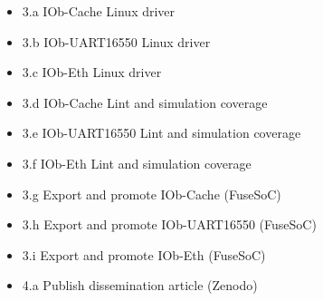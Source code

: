 \begin{description}[itemsep=3ex]
    \item[Milestone 3 - Test and Validation] \leavevmode
    \begin{itemize}[topsep=0pt, partopsep=0pt, itemsep=0.5ex, parsep=0pt]
        \item [ ] 3.a IOb-Cache Linux driver
        \item [ ] 3.b IOb-UART16550 Linux driver
        \item [ ] 3.c IOb-Eth Linux driver
        \item [$\checkmark$] 3.d IOb-Cache Lint and simulation coverage
        \item [$\checkmark$] 3.e IOb-UART16550 Lint and simulation coverage
        \item [$\checkmark$] 3.f IOb-Eth Lint and simulation coverage
        \item [$\checkmark$] 3.g Export and promote IOb-Cache (FuseSoC)
        \item [$\checkmark$] 3.h Export and promote IOb-UART16550 (FuseSoC)
        \item [$\checkmark$] 3.i Export and promote IOb-Eth (FuseSoC)
    \end{itemize}

    \item[Milestone 4 - Dissemination] \leavevmode
    \begin{itemize}[topsep=0pt, partopsep=0pt, itemsep=0.5ex, parsep=0pt]
        \item [ ] 4.a Publish dissemination article (Zenodo)
    \end{itemize}
\end{description}
